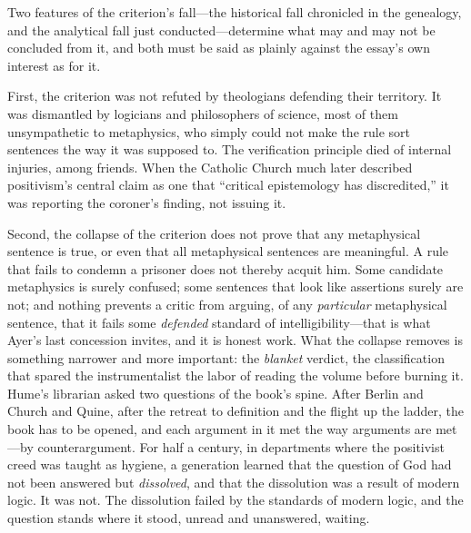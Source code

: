 Two features of the criterion's fall---the historical fall chronicled in the genealogy, and the analytical fall just conducted---determine what may and may not be concluded from it, and both must be said as plainly against the essay's own interest as for it.

First, the criterion was not refuted by theologians defending their territory. It was dismantled by logicians and philosophers of science, most of them unsympathetic to metaphysics, who simply could not make the rule sort sentences the way it was supposed to. The verification principle died of internal injuries, among friends. When the Catholic Church much later described positivism's central claim as one that ``critical epistemology has discredited,'' it was reporting the coroner's finding, not issuing it.

Second, the collapse of the criterion does not prove that any metaphysical sentence is true, or even that all metaphysical sentences are meaningful. A rule that fails to condemn a prisoner does not thereby acquit him. Some candidate metaphysics is surely confused; some sentences that look like assertions surely are not; and nothing prevents a critic from arguing, of any \emph{particular} metaphysical sentence, that it fails some \emph{defended} standard of intelligibility---that is what Ayer's last concession invites, and it is honest work. What the collapse removes is something narrower and more important: the \emph{blanket} verdict, the classification that spared the instrumentalist the labor of reading the volume before burning it. Hume's librarian asked two questions of the book's spine. After Berlin and Church and Quine, after the retreat to definition and the flight up the ladder, the book has to be opened, and each argument in it met the way arguments are met---by counterargument. For half a century, in departments where the positivist creed was taught as hygiene, a generation learned that the question of God had not been answered but \emph{dissolved}, and that the dissolution was a result of modern logic. It was not. The dissolution failed by the standards of modern logic, and the question stands where it stood, unread and unanswered, waiting.

